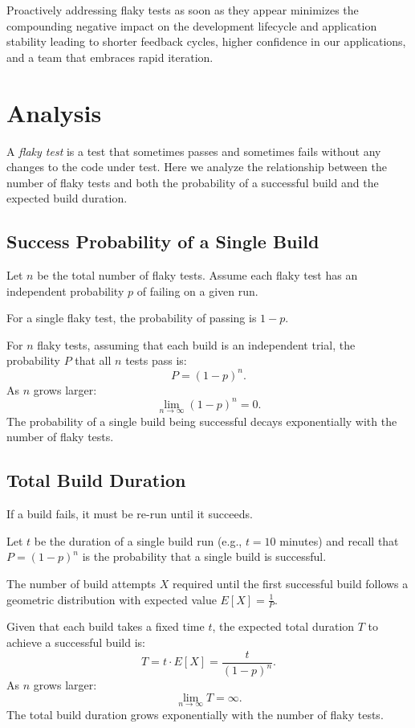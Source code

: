 \documentclass[letterpaper]{article}
\begin{document}
Proactively addressing flaky tests as soon as they appear minimizes the compounding negative impact on the development lifecycle and application stability leading to shorter feedback cycles, higher confidence in our applications, and a team that embraces rapid iteration. 

\section{Analysis}

A \textit{flaky test} is a test that sometimes passes and sometimes fails without any changes to the code under test. Here we analyze the relationship between the number of flaky tests and both the probability of a successful build and the expected build duration.

\subsection{Success Probability of a Single Build}

\setlength{\parskip}{1em}

Let \( n \) be the total number of flaky tests. Assume each flaky test has an independent probability \( p \) of failing on a given run.

For a single flaky test, the probability of passing is \( 1 - p \).

For \( n \) flaky tests, assuming that each build is an independent trial, the probability \( P \) that all \( n \) tests pass is:
\[
P = (1 - p)^n.
\]
As \( n \) grows larger:
\[
\lim_{n \to \infty} (1 - p)^n = 0.
\]
The probability of a single build being successful decays exponentially with the number of flaky tests.

\subsection{Total Build Duration}

If a build fails, it must be re-run until it succeeds. 

Let \( t \) be the duration of a single build run (e.g., \( t = 10 \) minutes) and recall that \( P = (1 - p)^n \) is the probability that a single build is successful. 

The number of build attempts \( X \) required until the first successful build follows a geometric distribution with expected value \(E[X] = \frac{1}{P}\).

Given that each build takes a fixed time \( t \), the expected total duration \( T \) to achieve a successful build is:
\[
T = t \cdot E[X] = \frac{t}{(1 - p)^n}.
\]
As \( n \) grows larger:
\[
\lim_{n \to \infty} T = \infty.
\]
The total build duration grows exponentially with the number of flaky tests.
\end{document}
